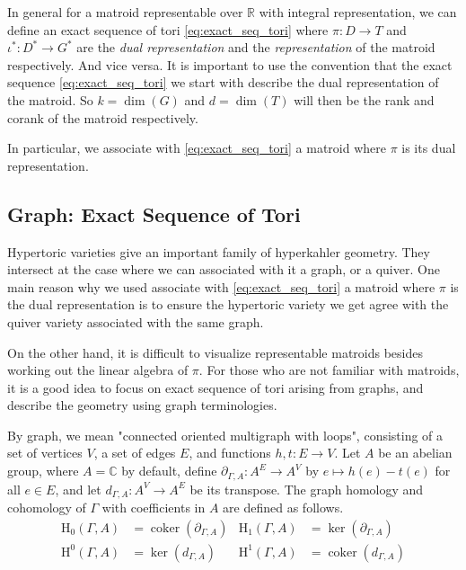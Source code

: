 \documentclass[b5paper]{article}
\newcommand{\HH}{\mathrm{H}}
\newcommand{\coker}{\operatorname{coker}}
\begin{document}
In general for a matroid representable over $\mathbb{R}$ with integral representation, we can define an exact sequence of tori \ref{eq:exact_seq_tori} where $\pi:D\rightarrow T$ and $\iota^*:D^*\rightarrow G^*$ are the \emph{dual representation} and the \emph{representation} of the matroid respectively. And vice versa. It is important to use the convention that the exact sequence \ref{eq:exact_seq_tori} we start with describe the dual representation of the matroid.
So $k=\dim(G)$ and $d=\dim(T)$ will then be the rank and corank of the matroid respectively. 

In particular, we associate with \ref{eq:exact_seq_tori} a matroid where $\pi$ is its dual representation.

\subsection{Graph: Exact Sequence of Tori}

Hypertoric varieties give an important family of hyperkahler geometry.
They intersect at the case where we can associated with it a graph, or a quiver. One main reason why we used associate with \ref{eq:exact_seq_tori} a matroid where $\pi$ is the dual representation is to ensure the hypertoric variety we get agree with the quiver variety associated with the same graph.

On the other hand, it is difficult to visualize representable matroids besides working out the linear algebra of $\pi$. For those who are not familiar with matroids, it is a good idea to focus on exact sequence of tori arising from graphs, and describe the geometry using graph terminologies. 

By graph, we mean "connected oriented multigraph with loops", consisting of a set of vertices $V$, a set of edges $E$, and functions $h,t:E\rightarrow V$.
Let $A$ be an abelian group, where $A=\mathbb{C}$ by default, define $ \partial_{\Gamma, A} : A^E \to A^V $ by $ e \mapsto h(e) - t(e) $ for all $ e \in E $, and let $ d_{\Gamma, A} : A^V \to A^E $ be its transpose.
The graph homology and cohomology of $\Gamma$ with coefficients in $A$ are defined as follows.
\begin{align*}
  \HH_0(\Gamma, A) &= \coker(\partial_{\Gamma, A}) & \HH_1(\Gamma, A) &= \ker(\partial_{\Gamma, A}) \\
  \HH^0(\Gamma, A) &= \ker(d_{\Gamma, A}) & \HH^1(\Gamma, A) &= \coker(d_{\Gamma, A})
\end{align*}
\end{document}
